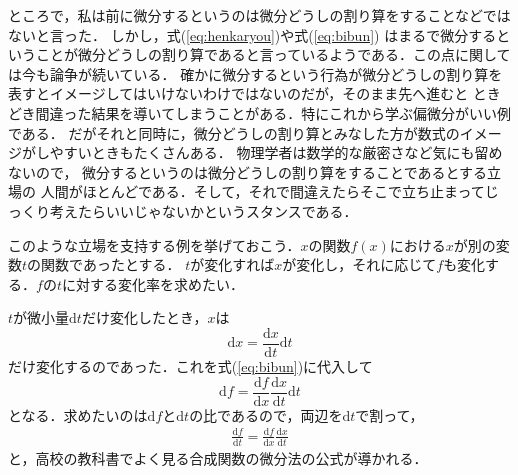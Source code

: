 ところで，私は前に微分するというのは微分どうしの割り算をすることなどではないと言った．
しかし，式(\ref{eq:henkaryou})や式(\ref{eq:bibun})
はまるで微分するということが微分どうしの割り算であると言っているようである．この点に関しては今も論争が続いている．
確かに微分するという行為が微分どうしの割り算を表すとイメージしてはいけないわけではないのだが，そのまま先へ進むと
ときどき間違った結果を導いてしまうことがある．特にこれから学ぶ偏微分がいい例である．
だがそれと同時に，微分どうしの割り算とみなした方が数式のイメージがしやすいときもたくさんある．
物理学者は数学的な厳密さなど気にも留めないので，
微分するというのは微分どうしの割り算をすることであるとする立場の
人間がほとんどである．そして，それで間違えたらそこで立ち止まってじっくり考えたらいいじゃないかというスタンスである．

このような立場を支持する例を挙げておこう．$x$の関数$f(x)$における$x$が別の変数$t$の関数であったとする．
$t$が変化すれば$x$が変化し，それに応じて$f$も変化する．$f$の$t$に対する変化率を求めたい．

$t$が微小量$\mathrm{d}t$だけ変化したとき，$x$は
$$
\mathrm{d}x = \frac{\mathrm{d}x}{\mathrm{d}t} \mathrm{d}t
$$
だけ変化するのであった．これを式(\ref{eq:bibun})に代入して
$$
\mathrm{d}f = \frac{\mathrm{d}f}{\mathrm{d}x}  \frac{\mathrm{d}x}{\mathrm{d}t} \mathrm{d}t
$$
となる．求めたいのは$\mathrm{d}f$と$\mathrm{d}t$の比であるので，両辺を$\mathrm{d}t$で割って，
\begin{align}
\frac{\mathrm{d}f}{\mathrm{d}t} = \frac{\mathrm{d}f}{\mathrm{d}x}  \frac{\mathrm{d}x}{\mathrm{d}t}
\label{eq:rensaritu}
\end{align}
と，高校の教科書でよく見る合成関数の微分法の公式が導かれる．

